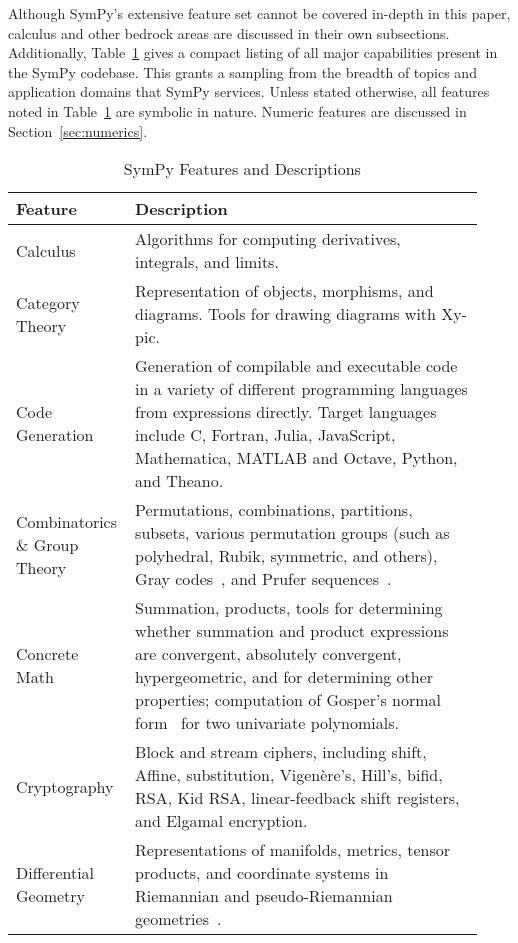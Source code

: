 
Although SymPy's extensive feature set cannot be covered in-depth in this paper,
calculus and other bedrock areas are discussed in their own subsections.
Additionally,
Table~\ref{features-table} gives a compact listing of all major capabilities
present in the SymPy codebase. This grants a sampling from the breadth of
topics and application domains that SymPy services. Unless stated otherwise,
all features noted in Table~\ref{features-table} are symbolic in nature.
Numeric features are discussed in Section~\ref{sec:numerics}.

\begin{longtable}[htbc]{p{0.20\linewidth}p{0.73\linewidth}}
\caption{SymPy Features and Descriptions\label{features-table}}\\
\toprule
\textbf{Feature} & \textbf{Description} \\
\midrule
Calculus & Algorithms for computing derivatives, integrals, and limits.\\

Category Theory & Representation of objects, morphisms, and diagrams. Tools
for drawing diagrams with Xy-pic.\\

Code Generation & Generation of compilable and executable code in a
variety of different programming languages from expressions directly. Target
languages include C, Fortran, Julia, JavaScript,
Mathematica, MATLAB and Octave, Python, and Theano.\\

Combinatorics \& Group Theory & Permutations, combinations,
partitions, subsets, various permutation groups (such as polyhedral, Rubik,
symmetric, and others), Gray codes~\cite{Nijenhuis1978combinatorial},
and Prufer sequences~\cite{biggs1976graph}.\\

Concrete Math & Summation, products, tools for determining whether summation
and product expressions are convergent, absolutely convergent, hypergeometric,
and for determining other properties; computation of Gosper's normal form~\cite{petkovvsek1996bak} for two univariate polynomials.\\

Cryptography & Block and stream ciphers, including shift, Affine,
substitution, Vigen\`{e}re's, Hill's, bifid, RSA, Kid RSA,
linear-feedback shift registers, and Elgamal encryption.\\

Differential Geometry & Representations of manifolds, metrics, tensor
products, and coordinate systems in Riemannian and pseudo-Riemannian
geometries~\cite{FunctionalDifferentialGeometry}.\\


\end{longtable}
